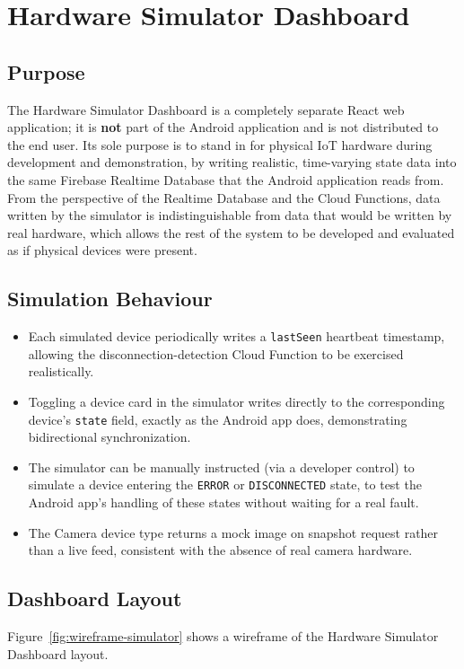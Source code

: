 \documentclass[11pt,a4paper]{article}
\begin{document}
\section{Hardware Simulator Dashboard}
\label{sec:simulator}

\subsection{Purpose}
The Hardware Simulator Dashboard is a completely separate React web application; it is \textbf{not} part of the Android application and is not distributed to the end user. Its sole purpose is to stand in for physical IoT hardware during development and demonstration, by writing realistic, time-varying state data into the same Firebase Realtime Database that the Android application reads from. From the perspective of the Realtime Database and the Cloud Functions, data written by the simulator is indistinguishable from data that would be written by real hardware, which allows the rest of the system to be developed and evaluated as if physical devices were present.

\subsection{Simulation Behaviour}
\begin{itemize}
    \item Each simulated device periodically writes a \texttt{lastSeen} heartbeat timestamp, allowing the disconnection-detection Cloud Function to be exercised realistically.
    \item Toggling a device card in the simulator writes directly to the corresponding device's \texttt{state} field, exactly as the Android app does, demonstrating bidirectional synchronization.
    \item The simulator can be manually instructed (via a developer control) to simulate a device entering the \texttt{ERROR} or \texttt{DISCONNECTED} state, to test the Android app's handling of these states without waiting for a real fault.
    \item The Camera device type returns a mock image on snapshot request rather than a live feed, consistent with the absence of real camera hardware.
\end{itemize}

\subsection{Dashboard Layout}
Figure~\ref{fig:wireframe-simulator} shows a wireframe of the Hardware Simulator Dashboard layout.
\end{document}
